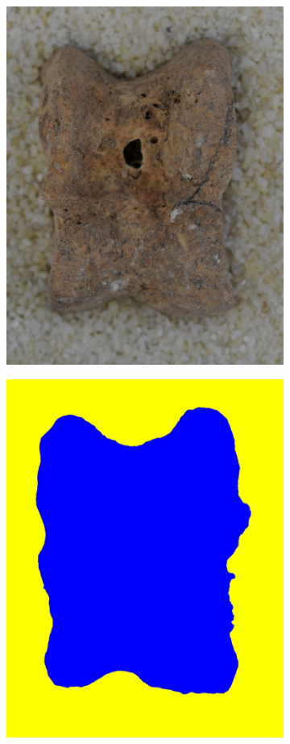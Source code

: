 \documentclass[pdftex,12pt,a4paper]{report}
\begin{document}
\begin{figure}[h]
\begin{subfigure}[b]{0.24\textwidth}
		\subcaption*{}
	\end{subfigure}
	\begin{subfigure}[b]{0.24\textwidth}
		\centering
		\includegraphics[width=.9\linewidth]{img/segmentation/bad/watershed/cut.jpg}
		\subcaption*{}
	\end{subfigure}
	\begin{subfigure}[b]{0.24\textwidth}
		\centering
		\includegraphics[width=.9\linewidth]{img/segmentation/bad/watershed/segmented.jpg}

\end{subfigure}
\end{figure}
\end{document}
